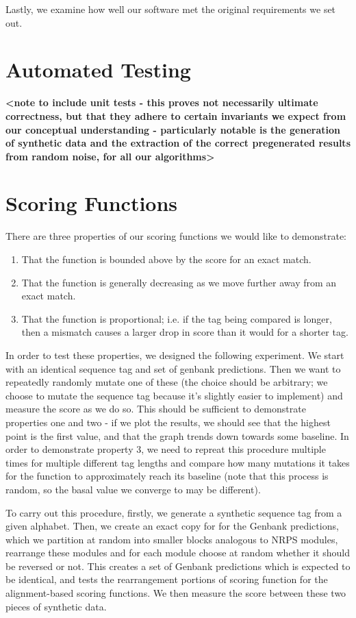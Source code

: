 \documentclass{l4proj}
\begin{document}
Lastly, we examine how well our software met the original requirements we set out.

\section{Automated Testing}

\textbf{<note to include unit tests - this proves not necessarily ultimate correctness, but that they adhere to certain invariants we expect from our conceptual understanding - particularly notable is the generation of synthetic data and the extraction of the correct pregenerated results from random noise, for all our algorithms>}

\section{Scoring Functions} \label{scoregraphs}

There are three properties of our scoring functions we would like to demonstrate:
\begin{enumerate}
	\item That the function is bounded above by the score for an exact match.
	\item That the function is generally decreasing as we move further away from an exact match.
	\item That the function is proportional; i.e. if the tag being compared is longer, then a mismatch causes a larger drop in score than it would for a 		shorter tag.
\end{enumerate}

In order to test these properties, we designed the following experiment. We start with an identical sequence tag and set of genbank predictions. Then we want to repeatedly randomly mutate one of these (the choice should be arbitrary; we choose to mutate the sequence tag because it's slightly easier to implement) and measure the score as we do so. This should be sufficient to demonstrate properties one and two - if we plot the results, we should see that the highest point is the first value, and that the graph trends down towards some baseline. In order to demonstrate property 3, we need to repreat this procedure multiple times for multiple different tag lengths and compare how many mutations it takes for the function to approximately reach its baseline (note that this process is random, so the basal value we converge to may be different).

To carry out this procedure, firstly, we generate a synthetic sequence tag from a given alphabet. Then, we create an exact copy for for the Genbank predictions, which we partition at random into smaller blocks analogous to NRPS modules, rearrange these modules and for each module choose at random whether it should be reversed or not. This creates a set of Genbank predictions which is expected to be identical, and tests the rearrangement portions of scoring function for the alignment-based scoring functions. We then measure the score between these two pieces of synthetic data.
\end{document}

